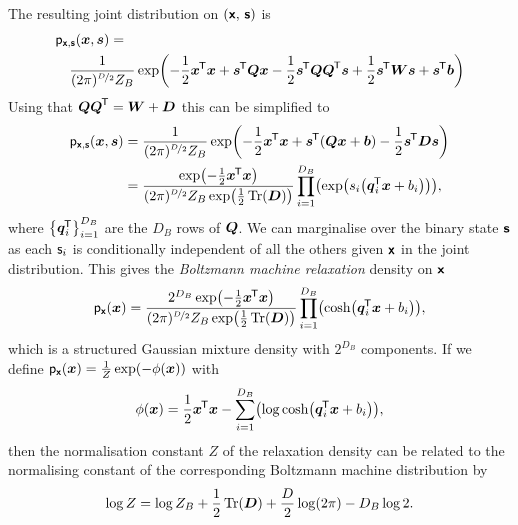 \noindent
The resulting joint distribution on $(\boldsymbol{\mathsf{x}},\,\boldsymbol{\mathsf{s}})$ is
\begin{equation}
\begin{split}
  &\pden{\rvct{x},\rvct{s}}(\vct{x},\vct{s})
  =\,\\
  &\quad
  \frac{1}{(2\pi)^{\nicefrac{D}{2}} Z_B} \exp\lpa 
    -\frac{1}{2} \vct{x}\tr\vct{x} + \vct{s}\tr\mtx{Q}\vct{x} 
    -\frac{1}{2}\vct{s}\tr\mtx{Q}\mtx{Q}\tr\vct{s} + \frac{1}{2}\vct{s}\tr\mtx{W}\vct{s} 
    + \vct{s}\tr\vct{b}
  \rpa
\end{split}
\end{equation}
Using that $\boldsymbol{Q}\boldsymbol{Q}^{\mkern-1.5mu\mathsf{T}} = \boldsymbol{W} + \boldsymbol{D}$ this can be simplified to
\begin{align}
 \pden{\rvct{x},\rvct{s}}(\vct{x},\vct{s})
  &=
  \frac{1}{(2\pi)^{\nicefrac{D}{2}} Z_B} \exp\lpa 
    -\frac{1}{2} \vct{x}\tr\vct{x} + \vct{s}\tr\lpa \mtx{Q}\vct{x} + \vct{b} \rpa
    -\frac{1}{2}\vct{s}\tr\mtx{D}\vct{s}
  \rpa
  \\
  &=
  \frac{\exp\lpa -\frac{1}{2} \vct{x}\tr\vct{x} \rpa}{(2\pi)^{\nicefrac{D}{2}} Z_B \exp\lpa\frac{1}{2}\Tr(\mtx{D})\rpa} 
  \prod_{i=1}^{D_B} \lpa
  \exp\lpa
    s_i\lpa \vct{q}_i\tr\vct{x} + b_i \rpa
  \rpa
  \rpa,
\end{align}
where $\fset{\vct{q}_i\tr}_{i=1}^{D_B}$ are the $D_B$ rows of $\boldsymbol{Q}$.
\noindent
We can marginalise over the binary state $\boldsymbol{\mathsf{s}}$ as each $\mathsf{s}_i$ is conditionally independent of all the others given $\boldsymbol{\mathsf{x}}$ in the joint distribution. This gives the \emph{Boltzmann machine relaxation} density on $\boldsymbol{\mathsf{x}}$
\begin{equation}
  \pden{\rvct{x}}(\vct{x}) =
  \frac
  {2^{D_B} \exp\lpa -\frac{1}{2} \vct{x}\tr\vct{x} \rpa }
  {(2\pi)^{\nicefrac{D}{2}} Z_B \exp\lpa\frac{1}{2}\Tr(\mtx{D})\rpa} 
  \prod_{i=1}^{D_B} \lpa \cosh\lpa\vct{q}_i\tr\vct{x} + b_i \rpa\rpa,
\end{equation}
which is a structured Gaussian mixture density with $2^{D_B}$ components.
\noindent
If we define $\pden{\rvct{x}}(\vct{x}) = \frac{1}{Z} \exp\lpa-\phi(\vct{x})\rpa$ with
\begin{equation}
  \phi(\vct{x}) = 
  \frac{1}{2} \vct{x}\tr\vct{x} -
  \sum_{i=1}^{D_B} \lpa \log\cosh\lpa\vct{q}_i\tr\vct{x} + b_i \rpa\rpa,
\end{equation}
then the normalisation constant $Z$ of the relaxation density can be related to the normalising constant of the corresponding Boltzmann machine distribution by
\begin{equation}
  \log{Z} = \log Z_B + \frac{1}{2}\operatorname{Tr}(\boldsymbol{D}) + \frac{D}{2}\log(2\pi) - D_B\log 2.
\end{equation}
